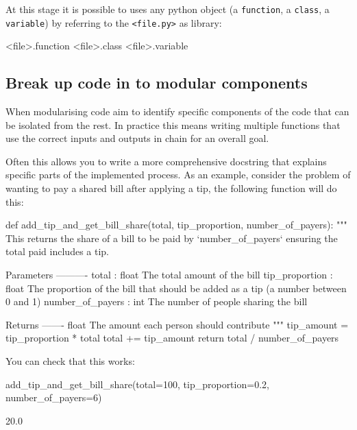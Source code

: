 At this stage it is possible to uses any python object (a \texttt{function}, a
\texttt{class}, a
\texttt{variable}) by referring to the \texttt{<file.py>} as library:

\begin{api}
<file>.function
<file>.class
<file>.variable
\end{api}


\subsection{Break up code in to modular components}

When modularising code aim to identify specific components of the code that can
be isolated from the rest.
In practice this means writing multiple functions that use the correct inputs
and outputs in chain for an overall goal.


Often this allows you to write a more comprehensive docstring that explains
specific parts of the implemented process.
As an example, consider the problem of wanting to pay a shared bill after
applying a tip, the following function will do this:




\begin{pyin}
def add_tip_and_get_bill_share(total, tip_proportion, number_of_payers):
    """
    This returns the share of a bill to be paid by `number_of_payers`
    ensuring the total paid includes a tip.

    Parameters
    ----------
    total : float
        The total amount of the bill
    tip_proportion : float
        The proportion of the bill that should be added as a tip (a number
        between 0 and 1)
    number_of_payers : int
        The number of people sharing the bill

    Returns
    -------
    float
        The amount each person should contribute
    """
    tip_amount = tip_proportion * total
    total += tip_amount
    return total / number_of_payers
\end{pyin}

You can check that this works:

\begin{pyin}
add_tip_and_get_bill_share(total=100, tip_proportion=0.2, number_of_payers=6)
\end{pyin}





\begin{raw}
20.0
\end{raw}

